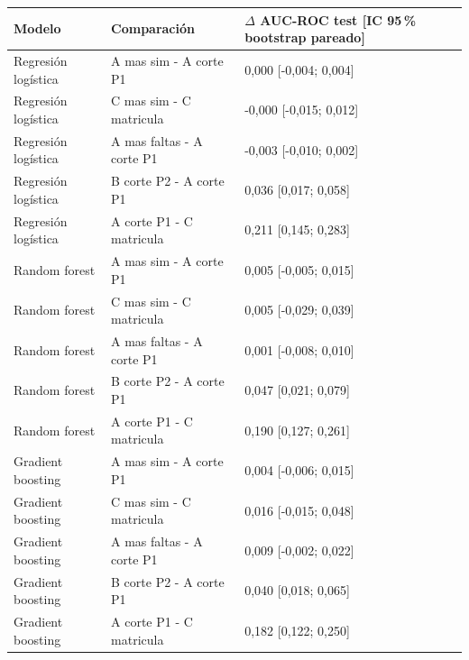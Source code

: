 \begin{tabular}{lll}
\toprule
Modelo & Comparación & $\Delta$ AUC-ROC test [IC 95\,\% bootstrap pareado] \\
\midrule
Regresión logística & A mas sim - A corte P1 & 0,000 [-0,004; 0,004] \\
Regresión logística & C mas sim - C matricula & -0,000 [-0,015; 0,012] \\
Regresión logística & A mas faltas - A corte P1 & -0,003 [-0,010; 0,002] \\
Regresión logística & B corte P2 - A corte P1 & 0,036 [0,017; 0,058] \\
Regresión logística & A corte P1 - C matricula & 0,211 [0,145; 0,283] \\
Random forest & A mas sim - A corte P1 & 0,005 [-0,005; 0,015] \\
Random forest & C mas sim - C matricula & 0,005 [-0,029; 0,039] \\
Random forest & A mas faltas - A corte P1 & 0,001 [-0,008; 0,010] \\
Random forest & B corte P2 - A corte P1 & 0,047 [0,021; 0,079] \\
Random forest & A corte P1 - C matricula & 0,190 [0,127; 0,261] \\
Gradient boosting & A mas sim - A corte P1 & 0,004 [-0,006; 0,015] \\
Gradient boosting & C mas sim - C matricula & 0,016 [-0,015; 0,048] \\
Gradient boosting & A mas faltas - A corte P1 & 0,009 [-0,002; 0,022] \\
Gradient boosting & B corte P2 - A corte P1 & 0,040 [0,018; 0,065] \\
Gradient boosting & A corte P1 - C matricula & 0,182 [0,122; 0,250] \\
\bottomrule
\end{tabular}
